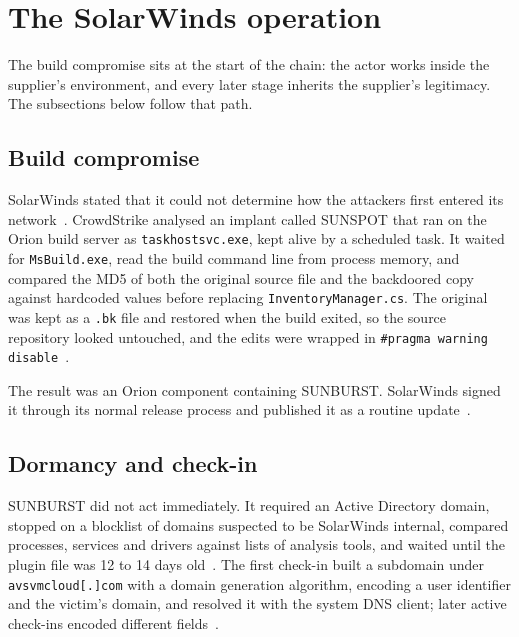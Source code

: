 \section{The SolarWinds operation}
\label{sec:operation}



The build compromise sits at the start of the chain: the actor works inside the supplier's environment, and every later stage inherits the supplier's legitimacy. The subsections below follow that path.

\subsection{Build compromise}

SolarWinds stated that it could not determine how the attackers first entered its network~\cite{solarwinds-sec}. CrowdStrike analysed an implant called SUNSPOT that ran on the Orion build server as \texttt{taskhostsvc.exe}, kept alive by a scheduled task. It waited for \texttt{MsBuild.exe}, read the build command line from process memory, and compared the MD5 of both the original source file and the backdoored copy against hardcoded values before replacing \texttt{InventoryManager.cs}. The original was kept as a \texttt{.bk} file and restored when the build exited, so the source repository looked untouched, and the edits were wrapped in \texttt{\#pragma warning disable}~\cite{crowdstrike-sunspot}.

The result was an Orion component containing SUNBURST. SolarWinds signed it through its normal release process and published it as a routine update~\cite{mandiant-campaign,mandiant-sunburst-details}.

\subsection{Dormancy and check-in}

SUNBURST did not act immediately. It required an Active Directory domain, stopped on a blocklist of domains suspected to be SolarWinds internal, compared processes, services and drivers against lists of analysis tools, and waited until the plugin file was 12 to 14 days old~\cite{mandiant-sunburst-details}. The first check-in built a subdomain under \texttt{avsvmcloud[.]com} with a domain generation algorithm, encoding a user identifier and the victim's domain, and resolved it with the system DNS client; later active check-ins encoded different fields~\cite{mandiant-sunburst-details}.

